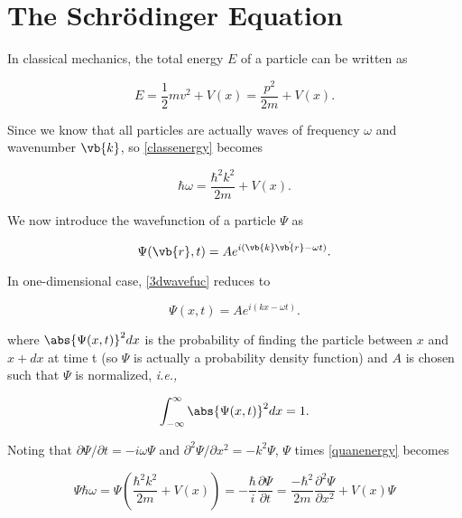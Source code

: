 \documentclass[a4paper,12pt]{report}
\begin{document}
\section{The Schrödinger Equation}
	
In classical mechanics, the total energy \(E\) of a particle can be written as 

\begin{equation}
  E=\frac{1}{2} mv^2 + V(x) = \frac{p^2}{2m} + V(x). \label{classenergy}
\end{equation}

Since we know that all particles are actually waves of frequency \(\omega\) and wavenumber \(\vb{k}\), so \cref{classenergy} becomes

\begin{equation} 
  \hbar \omega = \frac{\hbar^2k^2}{2m} + V(x). \label{quanenergy}
\end{equation}

We now introduce the wavefunction of a particle \(\Psi \) as

\begin{equation}
  \Psi (\vb{r} ,t) = Ae^{i(\vb{k} \dot{\vb{r} } - \omega t )}. \label{3dwavefuc} 
\end{equation}

In one-dimensional case, \cref{3dwavefuc} reduces to

\begin{equation}
  \Psi (x,t) = Ae^{i(kx - \omega t)}. \label{1dwavefuc}  
\end{equation}

where \(\abs{\Psi (x,t)}^2 dx\) is the probability of finding the particle between \(x\) and \(x + dx\) at time t (so \(\Psi\) is actually a probability density function) and \(A\) is chosen such that \(\Psi\) is normalized, \textit{i.e.,} 

\begin{equation}
  \int_{-\infty}^{\infty} \abs{\Psi (x,t)}^2 dx = 1.
\end{equation}

Noting that \( \partial \Psi /\partial t = -i \omega\Psi \) and \( \partial ^2\Psi /\partial x^2 = -k^2\Psi \), \(\Psi\) times \cref{quanenergy} becomes

\begin{equation}
  \Psi \hbar\omega = \Psi \left(\frac{\hbar ^2 k^2 }{2m} + V(x)\right) = -\frac{\hbar }{i} \frac{\partial\Psi}{\partial t} = \frac{-\hbar ^2 }{2m} \frac{\partial^2\Psi }{\partial x^2} + V(x)\Psi \label{fma} 
\end{equation}
\end{document}
